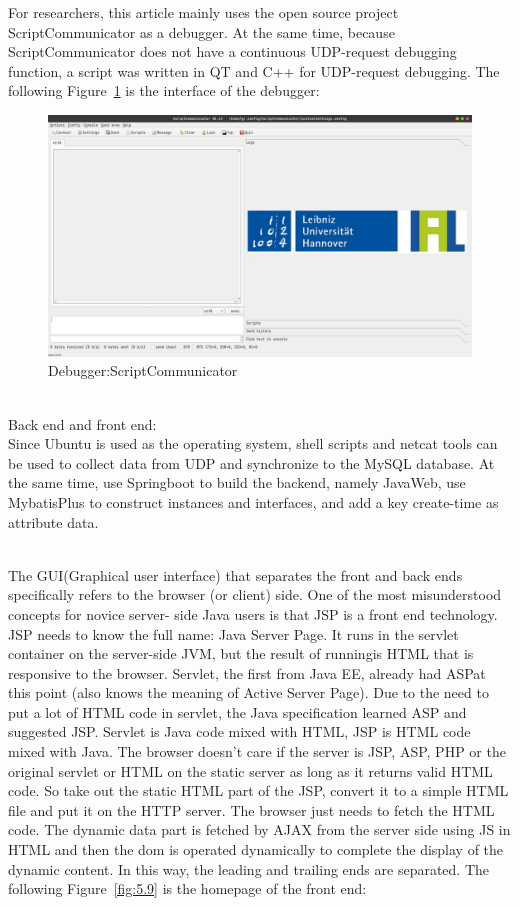 For researchers, this article mainly uses the open source project ScriptCommunicator as a debugger. At the same time, because ScriptCommunicator does not have a continuous UDP-request debugging function, a script was written in QT and C++ for UDP-request debugging.
The following Figure~\ref{fig:5.8} is the interface of the debugger:

\begin{figure}[!ht]
	\centering
	\includegraphics[width=16cm]{grafiken/5.8.pdf}
	\caption{Debugger:ScriptCommunicator} 
	\label{fig:5.8}
\end{figure}
\FloatBarrier
\\
Back end and front end:
\\
Since Ubuntu is used as the operating system, shell scripts and netcat tools can be used to collect data from UDP and synchronize to the MySQL database. At the same time, use Springboot to build the backend, namely JavaWeb, use MybatisPlus to construct instances and interfaces, and add a key create-time as attribute data.

\\
The GUI(Graphical user interface) that separates the front and back ends specifically refers to the browser (or client) side. One of the most misunderstood concepts for novice server-
side Java users is that JSP is a front end technology. JSP needs to know the full name: Java Server Page. It runs in the servlet container on the server-side JVM, but the result of runningis HTML that is responsive to the browser. Servlet, the first from Java EE, already had ASPat this point (also knows the meaning of Active Server Page). Due to the need to put a lot of HTML code in servlet, the Java specification learned ASP and suggested JSP. Servlet is Java code mixed with HTML, JSP is HTML code mixed with Java. The browser doesn’t care if the server is JSP, ASP, PHP or the original servlet or HTML on the static server as long as it returns valid HTML code. So take out the static HTML part of the JSP, convert it to a simple
HTML file and put it on the HTTP server. The browser just needs to fetch the HTML code. The dynamic data part is fetched by AJAX from the server side using JS in HTML and then the dom is operated dynamically to complete the display of the dynamic content. In this way, the leading and trailing ends are separated.
The following Figure~\ref{fig:5.9}  is the homepage of the front end:



